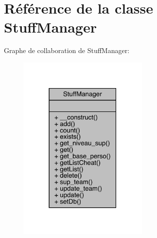 \hypertarget{class_stuff_manager}{}\section{Référence de la classe Stuff\+Manager}
\label{class_stuff_manager}


Graphe de collaboration de Stuff\+Manager\+:\nopagebreak
\begin{figure}[H]
\begin{center}
\leavevmode
\includegraphics[width=183pt]{class_stuff_manager__coll__graph}
\end{center}
\end{figure}
